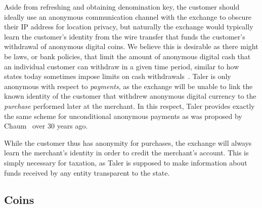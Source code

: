 \documentclass{llncs}
\begin{document}
Aside from refreshing and obtaining denomination key, the customer
should ideally use an anonymous communication channel with the exchange
to obscure their IP address for location privacy, but naturally 
the exchange would typically learn the customer's identity from the wire
transfer that funds the customer's withdrawal of anonymous digital coins.
We believe this is desirable as there might be laws, or bank policies,
that limit the amount of anonymous digital cash that an individual
customer can withdraw in a given time period, similar to how states today
sometimes impose limits on cash withdrawals~\cite{france2015cash,greece2015cash}.
Taler is only anonymous with respect to {\em payments}, as the exchange
will be unable to link the known identity of the customer that withdrew
anonymous digital currency to the {\em purchase} performed later at the
merchant.  In this respect, Taler provides exactly the same scheme for
unconditional anonymous payments as was proposed by
Chaum~\cite{chaum1983blind,chaum1990untraceable} over 30 years ago.

While the customer thus has anonymity for purchases, the exchange will
always learn the merchant's identity in order to credit the merchant's
account.  This is simply necessary for taxation, as Taler is supposed
to make information about funds received by any entity transparent
to the state.



\subsection{Coins}
\end{document}
